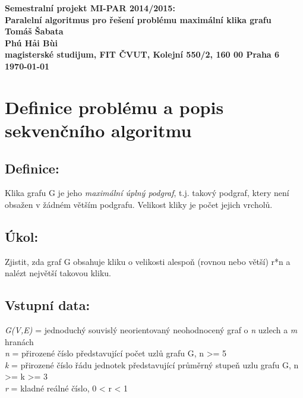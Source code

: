\documentclass[11pt]{article}
\begin{document}
\begin{center}
	\bf Semestralní projekt MI-PAR 2014/2015:\\[5mm]
	 Paralelní algoritmus pro řešení problému maximální klika grafu\\[5mm]
       	Tomáš Šabata\\
	 Ph{\'u} H{\h a}i B{\` u}i\\[2mm]
	magisterské studijum, FIT ČVUT, Kolejní 550/2, 160 00 Praha 6\\[2mm]
	\today
\end{center}

\section{Definice problému a popis sekvenčního algoritmu}



\subsection{Definice:}
Klika grafu G je jeho \textit{maximální úplný podgraf}, t.j. takový podgraf, ktery není obsažen v žádném větším podgrafu. Velikost kliky je počet jejich vrcholů.

\subsection{Úkol:}
Zjistit, zda graf G obsahuje kliku o velikosti alespoň (rovnou nebo větší) r*n a nalézt největší takovou kliku.

\subsection{Vstupní data:}
\textit{G(V,E)} = jednoduchý souvislý neorientovaný neohodnocený graf o \textit{n} uzlech a \textit{m} hranách \\
\textit{n} = přirozené číslo představující počet uzlů grafu G, n >= 5 \\
\textit{k} = přirozené číslo řádu jednotek představující průměrný stupeň uzlu grafu G, n >= k >= 3 \\
\textit{r} = kladné reálné číslo, 0 < r < 1 \\
\end{document}
